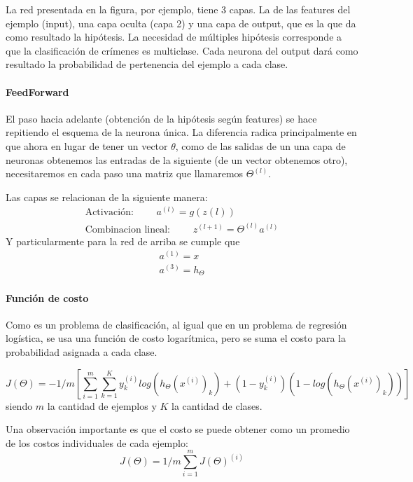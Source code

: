 La red presentada en la figura, por ejemplo, tiene 3 capas. La de las features del ejemplo (input), una capa oculta (capa 2) y una capa de output, que es la que da como resultado la hipótesis. La necesidad de múltiples hipótesis corresponde a que la clasificación de crímenes es multiclase. Cada neurona del output dará como resultado la probabilidad de pertenencia del ejemplo a cada clase.

\paragraph{FeedForward}
El paso hacia adelante (obtención de la hipótesis según features) se hace repitiendo el esquema de la neurona única. La diferencia radica principalmente en que ahora en lugar de tener un vector $\theta$, como de las salidas de un una capa de neuronas obtenemos las entradas de la siguiente (de un vector obtenemos otro), necesitaremos en cada paso una matriz que llamaremos $\Theta^{(l)}$.

Las capas se relacionan de la siguiente manera:
\begin{eqnarray}
\text{Activación: } \qquad a^{(l)} = g(z(l)) \\
\text{Combinacion lineal: } \qquad z^{(l+1)} = \Theta^{(l)} a^{(l)}
\end{eqnarray}
Y particularmente para la red de arriba se cumple que
\begin{eqnarray}
a^{(1)} = x \\
a^{(3)} = h_{\Theta}
\end{eqnarray}
\paragraph{Función de costo} Como es un problema de clasificación, al igual que en un problema de regresión logística, se usa una función de costo logarítmica, pero se suma el costo para la probabilidad asignada a cada clase.

\begin{equation}
J(\Theta) = -{1}/{m} \left[ \sum_{i = 1}^{m}\sum_{k = 1}^{K} y_k^{(i)}log(h_\Theta(x^{(i)})_k) + (1-y_k^{(i)})(1-log(h_\Theta(x^{(i)})_k)) \right]
\end{equation}
siendo $m$ la cantidad de ejemplos y $K$ la cantidad de clases.

Una observación importante es que el costo se puede obtener como un promedio de los costos individuales de cada ejemplo:
\begin{equation}
J(\Theta) = 1/m \sum_{i=1}^{m}J(\Theta)^{(i)}
\end{equation}

